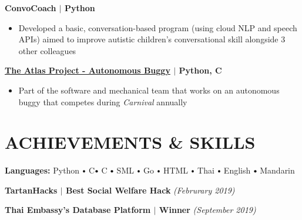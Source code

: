 \documentclass[10pt]{article}
\newcommand\sbullet[1][.5]{\mathbin{\vcenter{\hbox{\scalebox{#1}{$\bullet$}}}}}
\newcommand{\CC}{C\nolinebreak\hspace{-.05em}\raisebox{.4ex}{\tiny\bf +}\nolinebreak\hspace{-.10em}\raisebox{.4ex}{\tiny\bf +}}
\begin{document}
  \textbf{\large ConvoCoach $\mid$ Python} 
  \vspace*{-0.17cm}
  \begin{itemize}
    \itemsep-0.4em
    \item \textcolor{lighterG}{Developed a basic, conversation-based program (using cloud NLP and speech APIs) aimed to improve autistic children's conversational skill alongside 3 other colleagues}
  \end{itemize}

  \textbf{\large \href{https://sites.google.com/view/atlasbuggy/}{The Atlas Project - Autonomous Buggy} $\mid$ Python, \CC} 
  \vspace*{-0.17cm}
  \begin{itemize}
    \itemsep0em
    \item \textcolor{lighterG}{Part of the software and mechanical team that works on an autonomous buggy that competes during \textit{Carnival} annually}
  \end{itemize}


  \section*{\large \textcolor{lighterB}{ACHIEVEMENTS \& SKILLS}}
  \vspace*{-0.3cm}

    \textbf{Languages:}
    Python $\sbullet[.75]$ 
    \CC $\sbullet[.75]$ 
    C $\sbullet[.75]$ 
    SML $\sbullet[.75]$ 
    Go $\sbullet[.75]$ 
    HTML $\sbullet[.75]$ 
    Thai $\sbullet[.75]$ 
    English $\sbullet[.75]$ 
    Mandarin

    \vspace{0.1cm}

    \textbf{TartanHacks $\mid$ Best Social Welfare Hack} \hfill \textit{(Februrary 2019)}

    \textbf{Thai Embassy's Database Platform $\mid$ Winner} \hfill \textit{(September 2019)}
\end{document}
